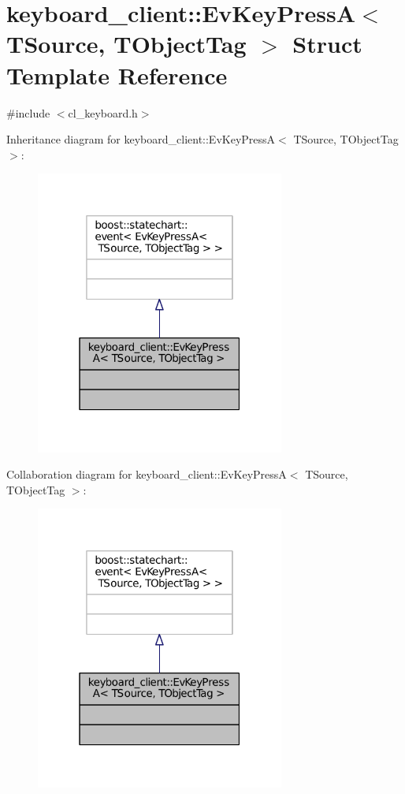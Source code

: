 \hypertarget{structkeyboard__client_1_1EvKeyPressA}{}\section{keyboard\+\_\+client\+:\+:Ev\+Key\+PressA$<$ T\+Source, T\+Object\+Tag $>$ Struct Template Reference}
\label{structkeyboard__client_1_1EvKeyPressA}


{\ttfamily \#include $<$cl\+\_\+keyboard.\+h$>$}



Inheritance diagram for keyboard\+\_\+client\+:\+:Ev\+Key\+PressA$<$ T\+Source, T\+Object\+Tag $>$\+:
\nopagebreak
\begin{figure}[H]
\begin{center}
\leavevmode
\includegraphics[width=232pt]{structkeyboard__client_1_1EvKeyPressA__inherit__graph}
\end{center}
\end{figure}


Collaboration diagram for keyboard\+\_\+client\+:\+:Ev\+Key\+PressA$<$ T\+Source, T\+Object\+Tag $>$\+:
\nopagebreak
\begin{figure}[H]
\begin{center}
\leavevmode
\includegraphics[width=232pt]{structkeyboard__client_1_1EvKeyPressA__coll__graph}
\end{center}
\end{figure}


